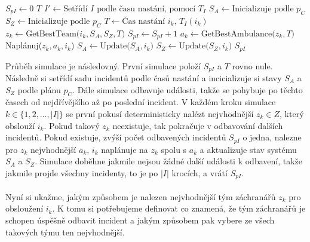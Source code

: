 \begin{algorithm}
  \begin{algorithmic}[1]  %
    \State $S_{pI} \gets 0$
    \State $T$ 
    \State $I' \gets \mbox{Setřídí $I$ podle času nastání, pomocí $T_I$}$
    \State $S_A \gets \mbox{Inicializuje podle $p_C$}$
    \State $S_Z \gets \mbox{Inicializuje podle $p_C$}$
      \State $T \gets \mbox{Čas nastání $i_k$, $T_I(i_k)$}$
      \State $z_k \gets \mbox{GetBestTeam($i_k, S_A, S_Z, T$)}$
        \State $S_{pI} \gets S_{pI} + 1$
        \State $a_k \gets \mbox{GetBestAmbulance($z_k, T$)}$
        \State Naplánuj($z_k, a_k, i_k$)
        \State $S_A \gets \mbox{Update($S_A, i_k$)}$
        \State $S_Z \gets \mbox{Update($S_Z, i_k$)}$
      \EndIf
    \EndFor
    \State \Return $S_{pI}$
  \EndFunction
  \end{algorithmic}
\end{algorithm}
\vspace*{25px}

Průběh simulace je následovný. 
První simulace položí $S_{pI}$ a $T$ rovno nule.
Následně si setřídí sadu incidentů podle časů nastání a incicializuje si stavy $S_A$ a $S_Z$ podle plánu $p_C$.
Dále simulace odbavuje události, takže se pohybuje po těchto časech od nejdřívějšího až po poslední incident.
V každém kroku simulace $k \in \{ 1, 2, \dots , |I|\}$ se první pokusí deterministicky nalézt nejvhodnější $z_k \in Z$, který obslouží $i_k$. 
Pokud takový $z_k$ neexistuje, tak pokračuje v odbavování dalších incidentů.
Pokud existuje, zvýší počet odbavených incidentů $S_{pI}$ o jedna, nalezne pro $z_k$ nejvhodnější $a_k$, $i_k$ naplánuje na $z_k$ spolu s $a_k$ a aktualizuje stav systému $S_A$ a $S_Z$.
Simulace doběhne jakmile nejsou žádné další události k odbavení, takže jakmile projde všechny incidenty, to je po $|I|$ krocích, a vrátí $S_{pI}$.
\\
\\
Nyní si ukažme, jakým způsobem je nalezen nejvhodnější tým záchranářů $z_k$ pro obsloužení $i_k$. K tomu si potřebujeme definovat co znamená,
že tým záchranářů je schopen úspěšně odbavit incident a jakým způsobem pak vybere ze všech takových týmu ten nejvhodnější.

\clearpage

